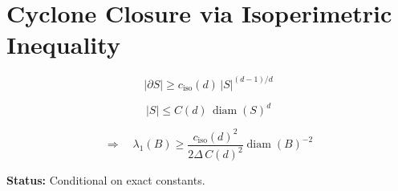 \documentclass{article}
\begin{document}
\section*{Cyclone Closure via Isoperimetric Inequality}

\[
|\partial S|\ge c_{\mathrm{iso}}(d)\,|S|^{(d-1)/d}
\]

\[
|S|\le C(d)\,\operatorname{diam}(S)^d
\]

\[
\Rightarrow\quad
\lambda_1(B)\ge
\frac{c_{\mathrm{iso}}(d)^2}{2\Delta\,C(d)^2}
\operatorname{diam}(B)^{-2}
\]

\textbf{Status:} Conditional on exact constants.
\end{document}
